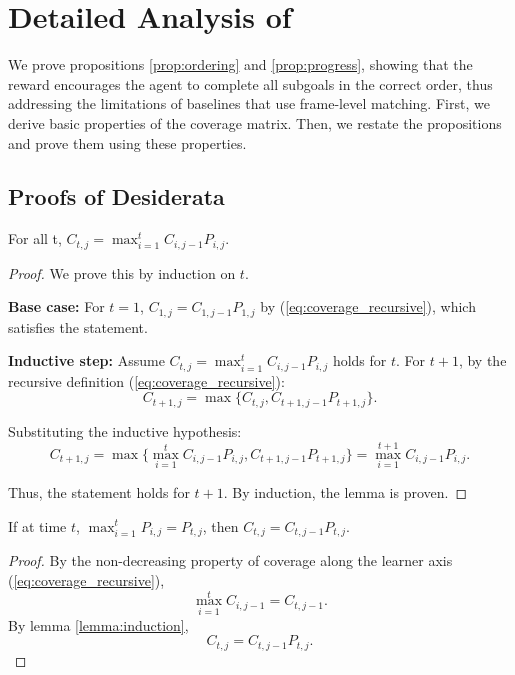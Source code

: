 \section{Detailed Analysis of \orca{}}

We prove propositions \ref{prop:ordering} and \ref{prop:progress}, showing that the \orca{} reward encourages the agent to complete all subgoals in the correct order, thus addressing the limitations of baselines that use frame-level matching.
First, we derive basic properties of the \orca{} coverage matrix. Then, we restate the propositions and prove them using these properties.

\subsection{Proofs of \orca{} Desiderata}
\begin{lemma}
For all t, $C_{t, j} = \max_{i=1}^{t} C_{i, j-1} P_{i, j}$.
\label{lemma:induction}
\end{lemma}

\begin{proof}
We prove this by induction on $t$.

\textbf{Base case:} For $t=1$, $C_{1, j} = C_{1, j-1} P_{1, j}$ by (\ref{eq:coverage_recursive}), which satisfies the statement.

\textbf{Inductive step:} Assume $C_{t, j} = \max_{i=1}^t C_{i, j-1} P_{i, j}$ holds for $t$. For $t+1$, by the recursive definition (\ref{eq:coverage_recursive}):
$$C_{t+1, j} = \max \{ C_{t, j}, C_{t+1, j-1} P_{t+1, j} \}.$$

Substituting the inductive hypothesis:
$$C_{t+1, j} = \max \{ \max_{i=1}^t C_{i, j-1} P_{i, j}, C_{t+1, j-1} P_{t+1, j} \} = \max_{i=1}^{t+1} C_{i, j-1} P_{i, j}.$$

Thus, the statement holds for $t+1$. By induction, the lemma is proven.
\end{proof}

\begin{corollary}
\label{coro:max_prob}
If at time $t$, $\max_{i=1}^{t} P_{i, j} = P_{t, j} $, then $C_{t, j} = C_{t, j-1}P_{t,j} $.
\end{corollary}
\begin{proof}
By the non-decreasing property of coverage along the learner axis (\ref{eq:coverage_recursive}),
\begin{equation}
\max_{i=1}^{t} C_{i, j-1}  = C_{t, j-1}.
\end{equation}
By lemma \ref{lemma:induction},
\begin{equation}
C_{t, j} = C_{t, j-1} P_{t, j}.
\end{equation}
\end{proof}

